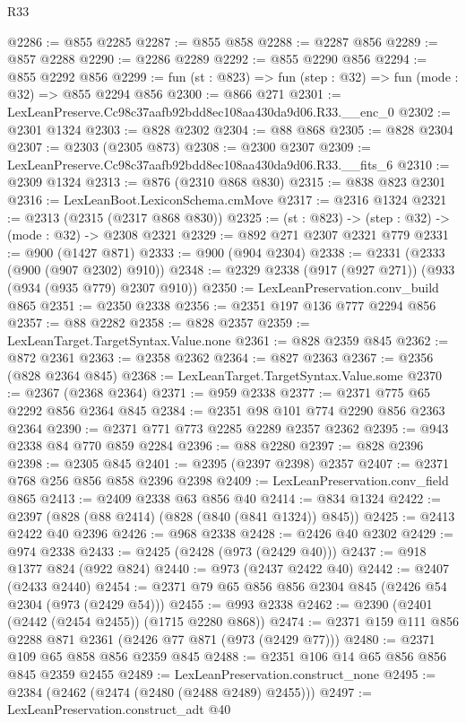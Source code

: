 \begin{lexlean}{R33}
\begin{coremodule}
@2286 := @855 @2285
@2287 := @855 @858
@2288 := @2287 @856
@2289 := @857 @2288
@2290 := @2286 @2289
@2292 := @855 @2290 @856
@2294 := @855 @2292 @856
@2299 := fun (st : @823) => fun (step : @32) => fun (mode : @32) => @855 @2294 @856
@2300 := @866 @271
@2301 := LexLeanPreserve.Cc98c37aafb92bdd8ec108aa430da9d06.R33.__enc_0
@2302 := @2301 @1324
@2303 := @828 @2302
@2304 := @88 @868
@2305 := @828 @2304
@2307 := @2303 (@2305 @873)
@2308 := @2300 @2307
@2309 := LexLeanPreserve.Cc98c37aafb92bdd8ec108aa430da9d06.R33.__fits_6
@2310 := @2309 @1324
@2313 := @876 (@2310 @868 @830)
@2315 := @838 @823 @2301
@2316 := LexLeanBoot.LexiconSchema.cmMove
@2317 := @2316 @1324
@2321 := @2313 (@2315 (@2317 @868 @830))
@2325 := (st : @823) -> (step : @32) -> (mode : @32) -> @2308 @2321
@2329 := @892 @271 @2307 @2321 @779
@2331 := @900 (@1427 @871)
@2333 := @900 (@904 @2304)
@2338 := @2331 (@2333 (@900 (@907 @2302) @910))
@2348 := @2329 @2338 (@917 (@927 @271)) (@933 (@934 (@935 @779) @2307 @910))
@2350 := LexLeanPreservation.conv_build @865
@2351 := @2350 @2338
@2356 := @2351 @197 @136 @777 @2294 @856
@2357 := @88 @2282
@2358 := @828 @2357
@2359 := LexLeanTarget.TargetSyntax.Value.none
@2361 := @828 @2359 @845
@2362 := @872 @2361
@2363 := @2358 @2362
@2364 := @827 @2363
@2367 := @2356 (@828 @2364 @845)
@2368 := LexLeanTarget.TargetSyntax.Value.some
@2370 := @2367 (@2368 @2364)
@2371 := @959 @2338
@2377 := @2371 @775 @65 @2292 @856 @2364 @845
@2384 := @2351 @98 @101 @774 @2290 @856 @2363 @2364
@2390 := @2371 @771 @773 @2285 @2289 @2357 @2362
@2395 := @943 @2338 @84 @770 @859 @2284
@2396 := @88 @2280
@2397 := @828 @2396
@2398 := @2305 @845
@2401 := @2395 (@2397 @2398) @2357
@2407 := @2371 @768 @256 @856 @858 @2396 @2398
@2409 := LexLeanPreservation.conv_field @865
@2413 := @2409 @2338 @63 @856 @40
@2414 := @834 @1324
@2422 := @2397 (@828 (@88 @2414) (@828 (@840 (@841 @1324)) @845))
@2425 := @2413 @2422 @40 @2396
@2426 := @968 @2338
@2428 := @2426 @40 @2302
@2429 := @974 @2338
@2433 := @2425 (@2428 (@973 (@2429 @40)))
@2437 := @918 @1377 @824 (@922 @824)
@2440 := @973 (@2437 @2422 @40)
@2442 := @2407 (@2433 @2440)
@2454 := @2371 @79 @65 @856 @856 @2304 @845 (@2426 @54 @2304 (@973 (@2429 @54)))
@2455 := @993 @2338
@2462 := @2390 (@2401 (@2442 (@2454 @2455)) (@1715 @2280 @868))
@2474 := @2371 @159 @111 @856 @2288 @871 @2361 (@2426 @77 @871 (@973 (@2429 @77)))
@2480 := @2371 @109 @65 @858 @856 @2359 @845
@2488 := @2351 @106 @14 @65 @856 @856 @845 @2359 @2455
@2489 := LexLeanPreservation.construct_none
@2495 := @2384 (@2462 (@2474 (@2480 (@2488 @2489) @2455)))
@2497 := LexLeanPreservation.construct_adt @40

\end{coremodule}
\end{lexlean}

